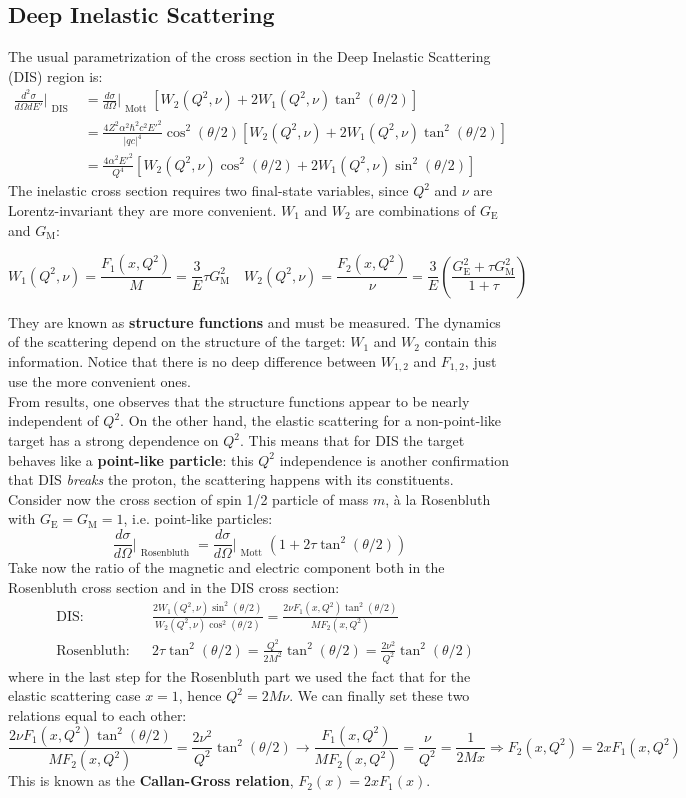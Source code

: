 \documentclass[10.75pt,a4paper,openright,bottom=2cm]{article}
\newcommand{\beginbox}[1]{\begin{tcolorbox}[width=\textwidth,colback={yellow!50},title={#1},colbacktitle={gray!50},coltitle=black]}
\renewcommand{\endbox}{\end{tcolorbox}\noindent}
\begin{document}
\subsection{Deep Inelastic Scattering}
The usual parametrization of the cross section in the Deep Inelastic Scattering (DIS) region is:
\begin{align*}
\frac{d^2\sigma}{d\Omega dE'}\Bigr|_{\substack{\text{DIS}}}&=\frac{d\sigma}{d\Omega}\Bigr|_{\substack{\text{Mott}}}[W_2(Q^2,\nu)+2W_1(Q^2,\nu)\tan^2(\theta/2)]\\
&=\frac{4Z^2\alpha^2\hbar^2c^2E'^2}{|qc|^4}\cos^2(\theta/2)[W_2(Q^2,\nu)+2W_1(Q^2,\nu)\tan^2(\theta/2)]\\
&=\frac{4\alpha^2E'^2}{Q^4}[W_2(Q^2,\nu)\cos^2(\theta/2)+2W_1(Q^2,\nu)\sin^2(\theta/2)]
\end{align*}
The inelastic cross section requires two final-state variables, since $Q^2$ and $\nu$ are Lorentz-invariant they are more convenient. $W_1$ and $W_2$ are combinations of $G_{\text{E}}$ and $G_{\text{M}}$:
\beginbox{Structure Functions}
\[
W_1(Q^2,\nu)=\frac{F_1(x,Q^2)}{M}=\frac{3}{E}\tau G^2_{\text{M}} \quad W_2(Q^2,\nu)=\frac{F_2(x,Q^2)}{\nu}=\frac{3}{E}\left(\frac{G^2_{\text{E}}+\tau G_{\text{M}}^2}{1+\tau}\right)
\]
\endbox
They are known as \textbf{structure functions} and must be measured. The dynamics of the scattering depend on the structure of the target: $W_1$ and $W_2$ contain this information. Notice that there is no deep difference between $W_{1,2}$ and $F_{1,2}$, just use the more convenient ones.\\
From results, one observes that the structure functions appear to be nearly independent of $Q^2$. On the other hand, the elastic scattering for a non-point-like target has a strong dependence on $Q^2$. This means that for DIS the target behaves like a \textbf{point-like particle}: this $Q^2$ independence is another confirmation that DIS \textit{breaks} the proton, the scattering happens with its constituents.\\
Consider now the cross section of spin 1/2 particle of mass $m$, à la Rosenbluth with $G_{\text{E}}=G_{\text{M}}=1$, i.e. point-like particles:
\[
\frac{d\sigma}{d\Omega}\Bigr|_{\substack{\text{Rosenbluth}}}=\frac{d\sigma}{d\Omega}\Bigr|_{\substack{\text{Mott}}}(1+2\tau\tan^2(\theta/2))
\]
Take now the ratio of the magnetic and electric component both in the Rosenbluth cross section and in the DIS cross section:
\[
\begin{aligned}
&\text{DIS}: &&\frac{2W_1(Q^2,\nu)\sin^2(\theta/2)}{W_2(Q^2,\nu)\cos^2(\theta/2)}=\frac{2\nu F_1(x,Q^2)\tan^2(\theta/2)}{MF_2(x,Q^2)}\\
&\text{Rosenbluth}: &&2\tau\tan^2(\theta/2)=\frac{Q^2}{2M^2}\tan^2(\theta/2)=\frac{2\nu^2}{Q^2}\tan^2(\theta/2)
\end{aligned}
\]
where in the last step for the Rosenbluth part we used the fact that for the elastic scattering case $x=1$, hence $Q^2=2M\nu$. We can finally set these two relations equal to each other:
\[
\frac{2\nu F_1(x,Q^2)\tan^2(\theta/2)}{MF_2(x,Q^2)}=\frac{2\nu^2}{Q^2}\tan^2(\theta/2)\to\frac{F_1(x,Q^2)}{MF_2(x,Q^2)}=\frac{\nu}{Q^2}=\frac{1}{2Mx}\Rightarrow F_2(x,Q^2)=2xF_1(x,Q^2)
\]
This is known as the \textbf{Callan-Gross relation}, $F_2(x)=2xF_1(x)$.
\end{document}
